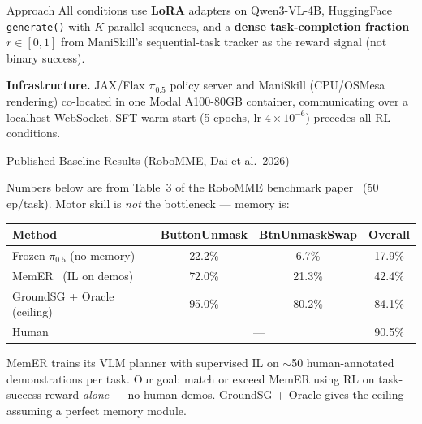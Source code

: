 \documentclass[final]{beamer}
\newlength{\colwidth}
\begin{document}
\begin{frame}[t]
\begin{columns}[t]
\begin{column}{\colwidth}
\begin{block}{Approach}
    All conditions use \textbf{LoRA} adapters on Qwen3-VL-4B, HuggingFace \texttt{generate()} with $K$ parallel sequences, and a \textbf{dense task-completion fraction} $r \in [0,1]$ from ManiSkill's sequential-task tracker as the reward signal (not binary success).

    \vspace{0.5em}
    \textbf{Infrastructure.} JAX/Flax $\pi_{0.5}$ policy server and ManiSkill (CPU/OSMesa rendering) co-located in one Modal A100-80GB container, communicating over a localhost WebSocket. SFT warm-start (5 epochs, lr $4 \times 10^{-6}$) precedes all RL conditions.

  \end{block}

  \begin{block}{Published Baseline Results (RoboMME, Dai et al.\ 2026)}

    Numbers below are from Table~3 of the RoboMME benchmark paper~\cite{robomme} (50 ep/task).
    Motor skill is \textit{not} the bottleneck --- memory is:

    \vspace{0.5em}
    \begin{center}
    \small
    \begin{tabular}{lccc}
      \toprule
      \textbf{Method} & \textbf{ButtonUnmask} & \textbf{BtnUnmaskSwap} & \textbf{Overall} \\
      \midrule
      Frozen $\pi_{0.5}$ (no memory) & 22.2\% & 6.7\%  & 17.9\% \\
      MemER~\cite{memer} (IL on demos)        & 72.0\% & 21.3\% & 42.4\% \\
      GroundSG + Oracle (ceiling)    & 95.0\% & 80.2\% & 84.1\% \\
      \midrule
      Human                          & \multicolumn{2}{c}{---} & 90.5\% \\
      \bottomrule
    \end{tabular}
    \end{center}
    \vspace{0.3em}
    \footnotesize{MemER trains its VLM planner with supervised IL on ${\sim}$50 human-annotated demonstrations per task.
    Our goal: match or exceed MemER using RL on task-success reward \textit{alone} --- no human demos.
    GroundSG + Oracle gives the ceiling assuming a perfect memory module.}

  \end{block}

\end{column}


\end{columns}
\end{frame}
\end{document}
